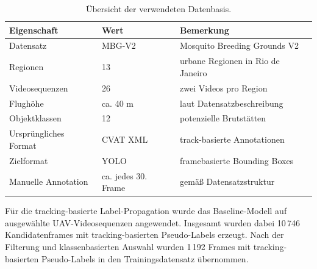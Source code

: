\begin{table}[H]
    \centering
    \caption{Übersicht der verwendeten Datenbasis.}
    \label{tab:anhang_datenbasis}
    \begin{tabular}{lll}
        \toprule
        \textbf{Eigenschaft}  & \textbf{Wert}       & \textbf{Bemerkung}                \\
        \midrule
        Datensatz             & MBG-V2              & Mosquito Breeding Grounds V2      \\
        Regionen              & 13                  & urbane Regionen in Rio de Janeiro \\
        Videosequenzen        & 26                  & zwei Videos pro Region            \\
        Flughöhe              & ca. 40 m            & laut Datensatzbeschreibung        \\
        Objektklassen         & 12                  & potenzielle Brutstätten           \\
        Ursprüngliches Format & CVAT XML            & track-basierte Annotationen       \\
        Zielformat            & YOLO                & framebasierte Bounding Boxes      \\
        Manuelle Annotation   & ca. jedes 30. Frame & gemäß Datensatzstruktur           \\
        \bottomrule
    \end{tabular}
\end{table}

Für die tracking-basierte Label-Propagation wurde das Baseline-Modell auf
ausgewählte UAV-Videosequenzen angewendet. Insgesamt wurden dabei
10\,746 Kandidatenframes mit tracking-basierten Pseudo-Labels erzeugt. Nach der
Filterung und klassenbasierten Auswahl wurden 1\,192 Frames mit
tracking-basierten Pseudo-Labels in den Trainingsdatensatz übernommen.

